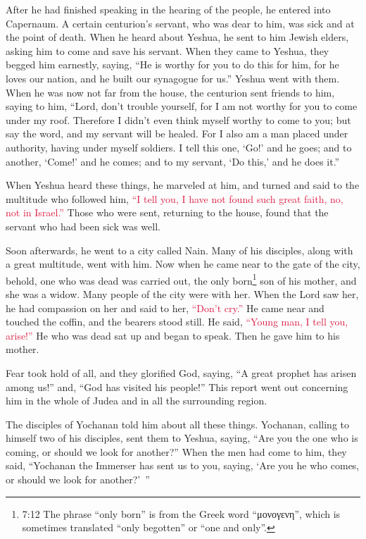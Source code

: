 \mychapter{} \myverse*{}After he had finished speaking in the hearing of the people, he
entered into Capernaum.
\myverse{}A certain centurion’s servant, who was dear to him, was sick and at the point
of death.
\myverse{}When he heard about Yeshua, he sent to him Jewish elders, asking him to come
and save his servant.
\myverse{}When they came to Yeshua, they begged him earnestly, saying, “He is worthy for
you to do this for him,
\myverse{}for he loves our nation, and he built our synagogue for us.”
\myverse{}Yeshua went with them. When he was now not far from the house, the centurion
sent friends to him, saying to him, “Lord, don’t trouble yourself, for I am not worthy for you to come
under my roof.
\myverse{}Therefore I didn’t even think myself worthy to come to you; but say the word,
and my servant will be healed.
\myverse{}For I also am a man placed under authority, having under myself soldiers. I
tell this one, ‘Go!’ and he goes; and to another, ‘Come!’ and he comes; and to my servant, ‘Do this,’
and he does it.”

\myverse{}When Yeshua heard these things, he marveled at him, and turned
and said to the multitude who followed him,
\textcolor{crimson}{“I tell you, I have not found such great faith, no, not in Israel.”}
\myverse{}Those who were sent, returning to the house, found that the servant who had
been sick was well.

\myverse{}Soon afterwards, he went to a city called Nain. Many of his disciples,
along with a great multitude, went with him.
\myverse{}Now when he came near to the gate of the city, behold, one who was dead was
carried out, the only born\footnote{7:12 The phrase “only born” is from the Greek word “μονογενη”, which is sometimes translated “only
	begotten” or “one and only”.
} son of his mother, and she was a widow. Many people of the city were with her.
\myverse{}When the Lord saw her, he had compassion on her and said to her,
\textcolor{crimson}{“Don’t cry.”}
\myverse{}He came near and touched the coffin, and the bearers stood still. He said,
\textcolor{crimson}{“Young man, I tell you, arise!”}
\myverse{}He who was dead sat up and began to speak. Then he gave him to his mother.

\myverse{}Fear took hold of all, and they glorified God, saying, “A great
prophet has arisen among us!” and, “God has visited his people!”
\myverse{}This report went out concerning him in the whole of Judea and in all the surrounding
region.

\myverse{}The disciples of Yochanan told him about all these things.
\myverse{}Yochanan, calling to himself two of his disciples, sent them to Yeshua, saying,
“Are you the one who is coming, or should we look for another?”
\myverse{}When the men had come to him, they said, “Yochanan the Immerser has sent us
to you, saying, ‘Are you he who comes, or should we look for another?’ ”

